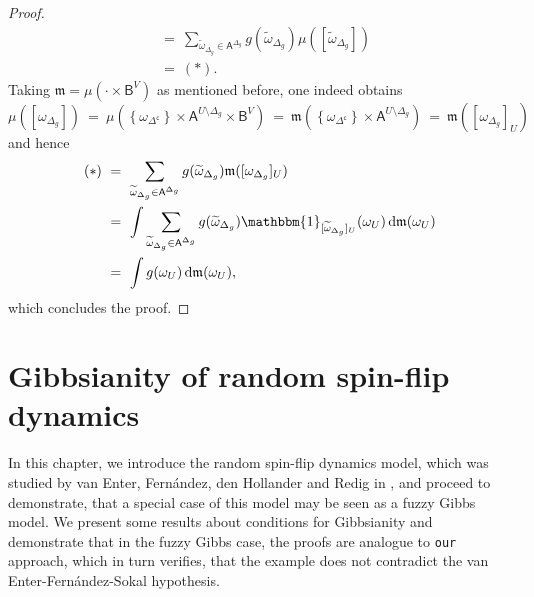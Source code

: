 \documentclass[12pt]{article}
\renewcommand{\AA}{\mathsf{A}}
\newcommand{\AB}{\mathsf{B}}
\renewcommand{\d}{\mathrm{d}}
\newcommand{\set}[1]{\left\{#1\right\}}
\newcommand{\pika}{\boldsymbol{\cdot}}
\newcommand{\1}{\mathbbm{1}}
\renewcommand{\c}{\mathsf{c}}
\newcommand{\5}{\vspace{0.5cm}}
\renewcommand{\tilde}{\widetilde}
\theoremstyle{definition}
\begin{document}
\begin{proof}
\begin{align*}
&=~ \sum_{\tilde{\omega}_{\Delta_g}\in\AA^{\Delta_g}}g(\tilde{\omega}_{\Delta_g})\mu([\tilde{\omega}_{\Delta_g}]) \\
&=~ (*).
\end{align*}
Taking $\mathfrak{m}=\mu(\pika\times\AB^V)$ as mentioned before, one indeed obtains
$$\mu([\omega_{\Delta_g}]) ~=~ \mu(\set{\omega_{\Delta^\c}}\times\AA^{U\setminus\Delta_g}\times\AB^{V}) ~=~ \mathfrak{m}(\set{\omega_{\Delta^\c}}\times\AA^{U\setminus\Delta_g}) ~=~ \mathfrak{m}([\omega_{\Delta_g}]_U)$$
and hence
\begin{align*}
(*) ~&=~ \sum_{\tilde{\omega}_{\Delta_g}\in\AA^{\Delta_g}}g(\tilde{\omega}_{\Delta_g})\mathfrak{m}([\omega_{\Delta_g}]_U) \\
&=~ \int \sum_{\tilde{\omega}_{\Delta_g}\in\AA^{\Delta_g}}g(\tilde{\omega}_{\Delta_g})\1_{[\tilde{\omega}_{\Delta_g}]_U}(\omega_U)\,\d\mathfrak{m}(\omega_U) \\
&=~ \int g(\omega_U)\,\d\mathfrak{m}(\omega_U),
\end{align*}
which concludes the proof.

\end{proof}


\pagebreak


\section{Gibbsianity of random spin-flip dynamics}\label{ch:4}

In this chapter, we introduce the random spin-flip dynamics model, which was studied by van Enter, Fern\'andez, den Hollander and Redig in \cite{EFHR}, and proceed to demonstrate, that a special case of this model may be seen as a fuzzy Gibbs model. We present some results about conditions for Gibbsianity and demonstrate that in the fuzzy Gibbs case, the proofs are analogue to \texttt{our} approach, which in turn verifies, that the example does not contradict the van Enter-Fern\'andez-Sokal hypothesis.

\end{document}
